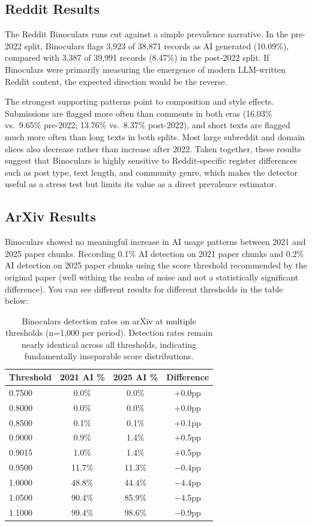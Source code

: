 \documentclass[11pt]{article}
\begin{document}
\subsection{Reddit Results}
The Reddit Binoculars runs cut against a simple prevalence narrative. In the
pre-2022 split, Binoculars flags 3,923 of 38,871 records as AI generated
(10.09\%), compared with 3,387 of 39,991 records (8.47\%) in the post-2022
split. If Binoculars were primarily measuring the emergence of modern
LLM-written Reddit content, the expected direction would be the reverse.

The strongest supporting patterns point to composition and style effects.
Submissions are flagged more often than comments in both eras (16.03\% vs.\
9.65\% pre-2022; 13.76\% vs.\ 8.37\% post-2022), and short texts are flagged
much more often than long texts in both splits. Most large subreddit and
domain slices also decrease rather than increase after 2022. Taken together,
these results suggest that Binoculars is highly sensitive to Reddit-specific
register differences such as post type, text length, and community genre,
which makes the detector useful as a stress test but limits its value as a
direct prevalence estimator. 

\subsection{ArXiv Results}
Binoculars showed no meaningful increase in AI usage patterns between 2021 and 2025 paper chunks. Recording 0.1\% AI detection on 2021 paper chunks and 0.2\% AI detection on 2025 paper chunks using the score threshold recommended by the original paper (well withing the realm of noise and not a statistically significant difference). You can see different results for different thresholds in the table below:

\begin{table}[t]
\centering
\small
\begin{tabular}{lccc}
\toprule
\textbf{Threshold} & \textbf{2021 AI \%} & \textbf{2025 AI \%} & \textbf{Difference} \\
\midrule
0.7500 &  0.0\% &  0.0\% & +0.0pp \\
0.8000 &  0.0\% &  0.0\% & +0.0pp \\
0.8500 &  0.1\% &  0.1\% & +0.1pp \\
0.9000 &  0.9\% &  1.4\% & +0.5pp \\
0.9015 &  1.0\% &  1.4\% & +0.5pp \\
0.9500 & 11.7\% & 11.3\% & $-$0.4pp \\
1.0000 & 48.8\% & 44.4\% & $-$4.4pp \\
1.0500 & 90.4\% & 85.9\% & $-$4.5pp \\
1.1000 & 99.4\% & 98.6\% & $-$0.9pp \\
\bottomrule
\end{tabular}
\caption{Binoculars detection rates on arXiv at multiple thresholds (n=1,000 per period). Detection rates remain nearly identical across all thresholds, indicating fundamentally inseparable score distributions.}
\label{tab:binoculars-thresholds}
\end{table}
\end{document}
